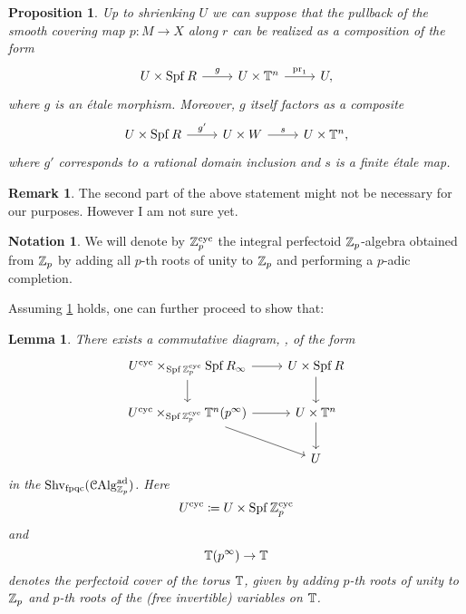 \documentclass[10pt,a4paper]{amsart}
\numberwithin{equation}{subsection}
\newtheorem{lemma}[theorem]{Lemma}
\newtheorem{proposition}[theorem]{Proposition}
\theoremstyle{definition}
\newtheorem{remark}[theorem]{Remark}
\newtheorem{notation}[theorem]{Notation}
\begin{document}
\begin{proposition} \label{stat_1} Up to shrienking $U$ we can suppose that the pullback of the smooth covering map $p \colon M \to X$ along $r$ can be realized as a composition of the form
    \[
    \begin{tikzcd}
        U \times \Spf R \ar{r}{g} & U \times \bT^n \ar{r}{\pr} & U ,
    \end{tikzcd}
    \]
where $g$ is an \'etale morphism. Moreover, $g$ itself factors as a composite
    \[
    \begin{tikzcd}
            U \times \Spf R \ar{r}{g'} & U \times W \ar{r}{s} & U \times \bT^n,
    \end{tikzcd}  
    \]
where $g'$ corresponds to a rational domain inclusion and $s$ is a finite \'etale map.
\end{proposition}

\begin{remark}
    The second part of the above statement might not be necessary for our purposes. However I am not sure yet.
\end{remark}

\begin{notation}
    We will denote by $\mathbb Z_p^{\mathrm{cyc}}$ the integral perfectoid $\mathbb Z_p$-algebra obtained from $\mathbb Z_p$ by adding all $p$-th roots of unity to $\mathbb Z_p$ and performing a $p$-adic completion.
\end{notation}
Assuming \cref{stat_1} holds, one can further proceed to show that:


\begin{lemma}
    There exists a commutative diagram, , of the form
    \begin{equation}
    \begin{tikzcd} \label{diag_chain_pulls}
            U^\cyc \times_{\Spf \cycbZp} \Spf R_\infty \ar{r} \ar{d} & U \times \Spf R \ar{d} \\  
            U^\cyc \times_{\Spf \cycbZp} \bT^n(p^\infty) \ar{r} \ar{rd} & U \times \bT^n \ar{d} \\
             & U
    \end{tikzcd}
    \end{equation}
    in the \infcat $\mathrm{Shv}_{\mathrm{fpqc}}(\mathcal C \mathrm{Alg}^{\mathrm{ad}}_{\mathbb Z_p})$. Here 
        \[
            U^{\mathrm{cyc}} \coloneqq U \times \operatorname{Spf} \mathbb Z_p^{\mathrm{cyc}}
        \]
    and 
         \[
            \mathbb T(p^\infty) \to \mathbb T 
        \]
        denotes the perfectoid cover of the torus $\mathbb T$, given by adding $p$-th roots of unity to $\mathbb Z_p$ and $p$-th roots of the (free invertible) variables on $\mathbb T$.
\end{lemma}
\end{document}
